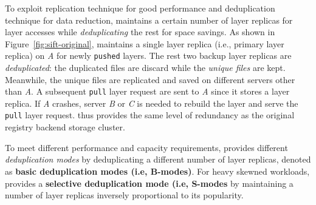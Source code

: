 To exploit replication technique for good performance and deduplication technique for data reduction,
\sysname maintains a certain number of layer replicas for layer accesses 
while \emph{deduplicating} the rest for space savings.
As shown in Figure~\ref{fig:sift-original},
\sysname maintains a single layer replica (i.e., primary layer replica) on \emph{A} for newly 
\texttt{pushed} layers.
%
The rest two backup layer replicas %
are \emph{deduplicated}: 
the duplicated files are discard while the \emph{unique files} are kept.
Meanwhile,
the unique files are replicated and saved on different servers other than \emph{A}.
%
A subsequent \texttt{pull} layer request are sent to \emph{A} since it stores a layer replica.
If \emph{A} crashes,
server \emph{B} or \emph{C} is needed to rebuild the layer and serve the \texttt{pull} layer request. %
\sysname thus provides the same level of redundancy as the original registry backend storage cluster. 

To meet different performance and capacity requirements,
\sysname provides different \emph{deduplication modes} by deduplicating a different number of layer replicas, denoted as
\textbf{basic deduplication modes (i.e, B-modes)}.
For heavy skewned workloads,
\sysname provides a \textbf{selective deduplication mode (i.e, S-modes}
by maintaining a number of layer replicas inversely proportional to its popularity.


